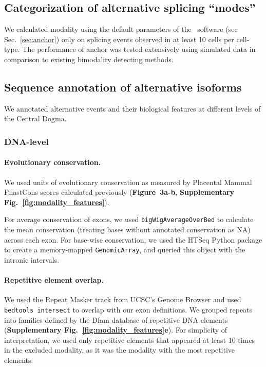 \subsection{Categorization of alternative splicing ``modes''}
We calculated modality using the default parameters of the \anchor\, software (see Sec.~\ref{sec:anchor}) only on splicing events observed in at least 10 cells per cell-type. The performance of anchor was tested extensively using simulated data in comparison to existing bimodality detecting methods.

\subsection{Sequence annotation of alternative isoforms}

We annotated alternative events and their biological features at different levels of the Central Dogma.

\subsubsection{DNA-level}

\paragraph{Evolutionary conservation.} We used units of evolutionary conservation as measured by Placental Mammal PhastCons\cite{Siepel:2005cu} scores calculated previously\cite{Lovci:2013cq} (\textbf{Figure~3a-b}, \textbf{Supplementary Fig.~\ref{fig:modality_features}}).

For average conservation of exons, we used \texttt{bigWigAverageOverBed}\cite{Kent:2010ff} to calculate the mean conservation (treating bases without annotated conservation as NA) across each exon. For base-wise conservation, we used the HTSeq\cite{Anders:2015gf} Python package to create a memory-mapped \texttt{GenomicArray}, and queried this object with the intronic intervals.


\paragraph{Repetitive element overlap.} We used the Repeat Masker track\cite{Rosenbloom:2015bg} from UCSC's Genome Browser\cite{Kent:2002bwa} and used \texttt{bedtools intersect}\cite{Quinlan:2010kma} to overlap with our exon definitions. We grouped repeats into families defined by the Dfam\cite{Hubley:2016fu} database of repetitive DNA elements (\textbf{Supplementary Fig.~\ref{fig:modality_features}e}). For simplicity of interpretation, we used only repetitive elements that appeared at least 10 times in the excluded modality, as it was the modality with the most repetitive elements.


